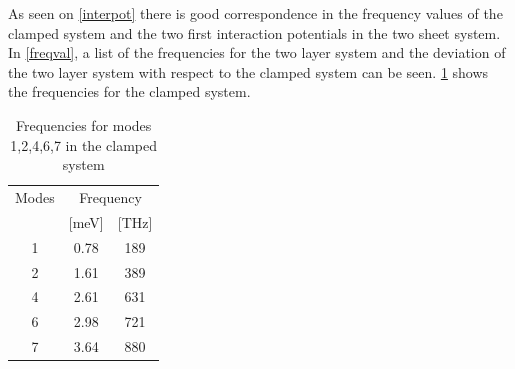 As seen on \cref{interpot} there is good correspondence in the frequency values of the clamped system and the two first interaction potentials in the two sheet system. In \cref{freqval}, a list of the frequencies for the two layer system and the deviation of the two layer system with respect to the clamped system can be seen. \cref{freqclamp} shows the frequencies for the clamped system. 
\begin{table}
  \centering
  \begin{tabular}{c|cc}
    \toprule
     Modes &     \multicolumn{2}{c}{Frequency}\\
           &   [\si{\meV}] & [THz] \\
    \hline \hline  
           1 &        0.78 & 189 \\
           2 &        1.61 & 389 \\
           4 &        2.61 & 631 \\
           6 &        2.98 & 721 \\
           7 &        3.64 & 880 \\
    \bottomrule
  \end{tabular}
  \caption{Frequencies for modes 1,2,4,6,7 in the clamped system}
  \label{freqclamp}
\end{table}

